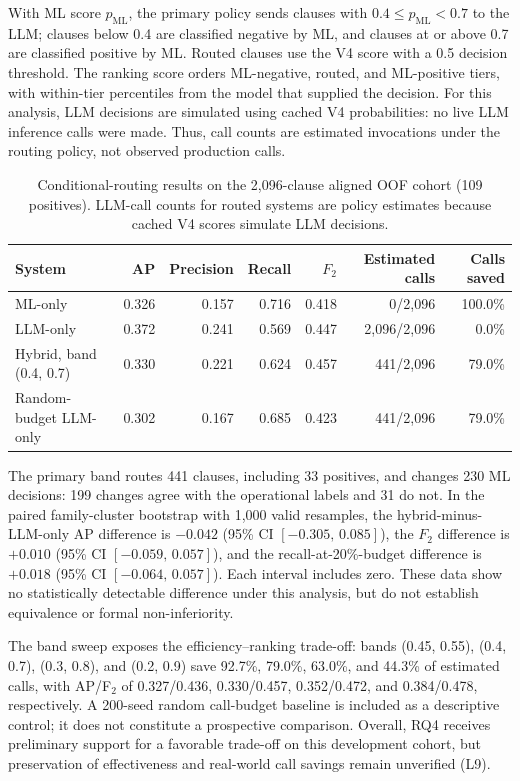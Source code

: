\documentclass[12pt,a4paper,oneside]{report}
\begin{document}
With ML score $p_{\mathrm{ML}}$, the primary policy sends clauses with $0.4 \leq p_{\mathrm{ML}} < 0.7$ to the LLM; clauses below 0.4 are classified negative by ML, and clauses at or above 0.7 are classified positive by ML. Routed clauses use the V4 score with a 0.5 decision threshold. The ranking score orders ML-negative, routed, and ML-positive tiers, with within-tier percentiles from the model that supplied the decision. For this analysis, LLM decisions are simulated using cached V4 probabilities: no live LLM inference calls were made. Thus, call counts are estimated invocations under the routing policy, not observed production calls.

\begin{table}[!tbp]
\caption{Conditional-routing results on the 2,096-clause aligned OOF cohort (109 positives). LLM-call counts for routed systems are policy estimates because cached V4 scores simulate LLM decisions.}
\label{tab:routing-results}
\centering
\footnotesize
\setlength{\tabcolsep}{4pt}
\begin{tabularx}{\textwidth}{>{\raggedright\arraybackslash}p{}rrrrrr}
\toprule
System & AP & Precision & Recall & $F_2$ & Estimated calls & Calls saved \\
\midrule
ML-only & 0.326 & 0.157 & 0.716 & 0.418 & 0/2,096 & 100.0\% \\
LLM-only & 0.372 & 0.241 & 0.569 & 0.447 & 2,096/2,096 & 0.0\% \\
Hybrid, band (0.4, 0.7) & 0.330 & 0.221 & 0.624 & 0.457 & 441/2,096 & 79.0\% \\
Random-budget LLM-only & 0.302 & 0.167 & 0.685 & 0.423 & 441/2,096 & 79.0\% \\
\bottomrule
\end{tabularx}
\end{table}

The primary band routes 441 clauses, including 33 positives, and changes 230 ML decisions: 199 changes agree with the operational labels and 31 do not. In the paired family-cluster bootstrap with 1,000 valid resamples, the hybrid-minus-LLM-only AP difference is $-0.042$ (95\% CI $[-0.305,\,0.085]$), the $F_2$ difference is $+0.010$ (95\% CI $[-0.059,\,0.057]$), and the recall-at-20\%-budget difference is $+0.018$ (95\% CI $[-0.064,\,0.057]$). Each interval includes zero. These data show no statistically detectable difference under this analysis, but do not establish equivalence or formal non-inferiority.

The band sweep exposes the efficiency--ranking trade-off: bands (0.45, 0.55), (0.4, 0.7), (0.3, 0.8), and (0.2, 0.9) save 92.7\%, 79.0\%, 63.0\%, and 44.3\% of estimated calls, with AP/F$_2$ of 0.327/0.436, 0.330/0.457, 0.352/0.472, and 0.384/0.478, respectively. A 200-seed random call-budget baseline is included as a descriptive control; it does not constitute a prospective comparison. Overall, RQ4 receives preliminary support for a favorable trade-off on this development cohort, but preservation of effectiveness and real-world call savings remain unverified (L9).
\end{document}
